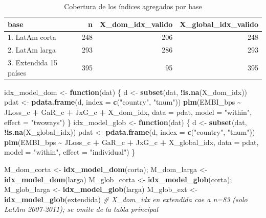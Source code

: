 \documentclass[
]{article}
\newenvironment{Shaded}{\begin{snugshade}}{\end{snugshade}}
\newcommand{\AttributeTok}[1]{\textcolor[rgb]{0.13,0.29,0.53}{#1}}
\newcommand{\CommentTok}[1]{\textcolor[rgb]{0.56,0.35,0.01}{\textit{#1}}}
\newcommand{\ControlFlowTok}[1]{\textcolor[rgb]{0.13,0.29,0.53}{\textbf{#1}}}
\newcommand{\FunctionTok}[1]{\textcolor[rgb]{0.13,0.29,0.53}{\textbf{#1}}}
\newcommand{\NormalTok}[1]{#1}
\newcommand{\OtherTok}[1]{\textcolor[rgb]{0.56,0.35,0.01}{#1}}
\newcommand{\SpecialCharTok}[1]{\textcolor[rgb]{0.81,0.36,0.00}{\textbf{#1}}}
\newcommand{\StringTok}[1]{\textcolor[rgb]{0.31,0.60,0.02}{#1}}
\begin{document}
\begin{longtable}[t]{lrrr}
\caption{\label{tab:control-idx-coverage}Cobertura de los índices agregados por base}\\
\toprule
base & n & X\_dom\_idx\_valido & X\_global\_idx\_valido\\
\midrule
1. LatAm corta & 248 & 206 & 248\\
2. LatAm larga & 293 & 286 & 293\\
3. Extendida 15 países & 395 & 95 & 395\\
\bottomrule
\end{longtable}

\begin{Shaded}
\begin{Highlighting}[]
\NormalTok{idx\_model\_dom }\OtherTok{\textless{}{-}} \ControlFlowTok{function}\NormalTok{(dat) \{}
\NormalTok{  d }\OtherTok{\textless{}{-}} \FunctionTok{subset}\NormalTok{(dat, }\SpecialCharTok{!}\FunctionTok{is.na}\NormalTok{(X\_dom\_idx))}
\NormalTok{  pdat }\OtherTok{\textless{}{-}} \FunctionTok{pdata.frame}\NormalTok{(d, }\AttributeTok{index =} \FunctionTok{c}\NormalTok{(}\StringTok{"country"}\NormalTok{, }\StringTok{"tnum"}\NormalTok{))}
  \FunctionTok{plm}\NormalTok{(EMBI\_bps }\SpecialCharTok{\textasciitilde{}}\NormalTok{ JLoss\_c }\SpecialCharTok{+}\NormalTok{ GaR\_c }\SpecialCharTok{+}\NormalTok{ JxG\_c }\SpecialCharTok{+}\NormalTok{ X\_dom\_idx, }\AttributeTok{data =}\NormalTok{ pdat,}
      \AttributeTok{model =} \StringTok{"within"}\NormalTok{, }\AttributeTok{effect =} \StringTok{"twoways"}\NormalTok{)}
\NormalTok{\}}
\NormalTok{idx\_model\_glob }\OtherTok{\textless{}{-}} \ControlFlowTok{function}\NormalTok{(dat) \{}
\NormalTok{  d }\OtherTok{\textless{}{-}} \FunctionTok{subset}\NormalTok{(dat, }\SpecialCharTok{!}\FunctionTok{is.na}\NormalTok{(X\_global\_idx))}
\NormalTok{  pdat }\OtherTok{\textless{}{-}} \FunctionTok{pdata.frame}\NormalTok{(d, }\AttributeTok{index =} \FunctionTok{c}\NormalTok{(}\StringTok{"country"}\NormalTok{, }\StringTok{"tnum"}\NormalTok{))}
  \FunctionTok{plm}\NormalTok{(EMBI\_bps }\SpecialCharTok{\textasciitilde{}}\NormalTok{ JLoss\_c }\SpecialCharTok{+}\NormalTok{ GaR\_c }\SpecialCharTok{+}\NormalTok{ JxG\_c }\SpecialCharTok{+}\NormalTok{ X\_global\_idx, }\AttributeTok{data =}\NormalTok{ pdat,}
      \AttributeTok{model =} \StringTok{"within"}\NormalTok{, }\AttributeTok{effect =} \StringTok{"individual"}\NormalTok{)}
\NormalTok{\}}

\NormalTok{M\_dom\_corta  }\OtherTok{\textless{}{-}} \FunctionTok{idx\_model\_dom}\NormalTok{(corta);      M\_dom\_larga  }\OtherTok{\textless{}{-}} \FunctionTok{idx\_model\_dom}\NormalTok{(larga)}
\NormalTok{M\_glob\_corta }\OtherTok{\textless{}{-}} \FunctionTok{idx\_model\_glob}\NormalTok{(corta);     M\_glob\_larga }\OtherTok{\textless{}{-}} \FunctionTok{idx\_model\_glob}\NormalTok{(larga)}
\NormalTok{M\_glob\_ext   }\OtherTok{\textless{}{-}} \FunctionTok{idx\_model\_glob}\NormalTok{(extendida)  }\CommentTok{\# X\_dom\_idx en extendida cae a n=83 (solo LatAm 2007{-}2011); se omite de la tabla principal}


\end{Highlighting}
\end{Shaded}
\end{document}
